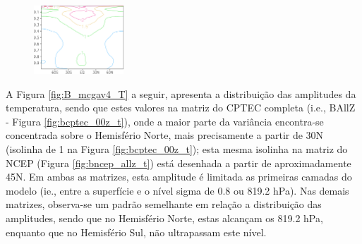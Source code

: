 \begin{figure}[H]
\begin{center}
{          \label{fig:bcptec_12z_chi}
          \includegraphics[width=0.3\textwidth,angle=0]{./figs/cap3/amplitudes_novas/amplitudes-B12Z_vp-crop-rotated270.pdf}
        }    
    \end{center}
  \vspace{2mm}
  \legenda{}
  \label{fig:B_mcgav4_chi}
\end{figure}

A Figura \ref{fig:B_mcgav4_T} a seguir, apresenta a distribuição das amplitudes da temperatura, sendo que estes valores na matriz do CPTEC completa (i.e., BAllZ - Figura \ref{fig:bcptec_00z_t}), onde a maior parte da variância encontra-se concentrada sobre o Hemisfério Norte, mais precisamente a partir de 30N (isolinha de 1 na Figura \ref{fig:bcptec_00z_t}); esta mesma isolinha na matriz do NCEP (Figura \ref{fig:bncep_allz_t}) está desenhada a partir de aproximadamente 45N. Em ambas as matrizes, esta amplitude é limitada as primeiras camadas do modelo (ie., entre a superfície e o nível sigma de 0.8 ou 819.2 hPa). Nas demais matrizes, observa-se um padrão semelhante em relação a distribuição das amplitudes, sendo que no Hemisfério Norte, estas alcançam os 819.2 hPa, enquanto que no Hemisfério Sul, não ultrapassam este nível.


